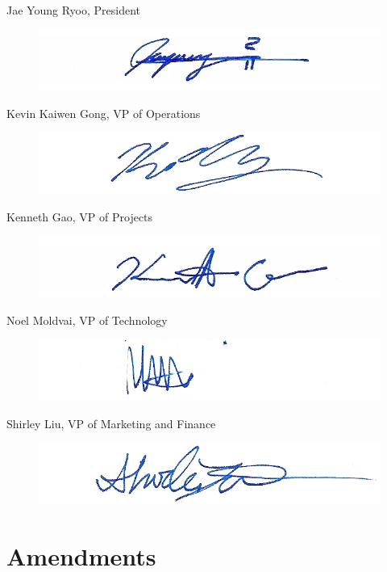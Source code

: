 \documentclass{article}
\begin{document}
Jae Young Ryoo, President
\begin{figure} [H]
\includegraphics[scale = .4]{signatures/signatures_jay.png}
\end{figure}
Kevin Kaiwen Gong, VP of Operations
\begin{figure} [H]
\includegraphics[scale = .4]{signatures/signatures_kevin.png}
\end{figure}
Kenneth Gao, VP of Projects
\begin{figure} [H]
\includegraphics[scale = .4]{signatures/signatures_kenneth.png}
\end{figure}
Noel Moldvai, VP of Technology
\begin{figure} [H]
\includegraphics[scale = .4]{signatures/signatures_noel.png}
\end{figure}
Shirley Liu, VP of Marketing and Finance
\begin{figure} [H]
\includegraphics[scale = .4]{signatures/signatures_shirley.png}
\end{figure}

\section{Amendments}
\end{document}
